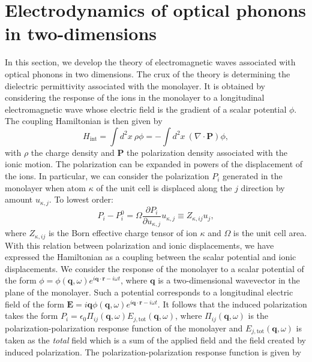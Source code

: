 \documentclass[aps,prb,twocolumn,
groupedaddress,superscriptaddress,
amsfonts,amssymb,amsmath,floatfix,
citeautoscript]{revtex4-1}
\begin{document}
	\section{Electrodynamics of optical phonons in two-dimensions}
	
	In this section, we develop the theory of electromagnetic waves associated with optical phonons in two dimensions. The crux of the theory is determining the dielectric permittivity associated with the monolayer. It is obtained by considering the response of the ions in the monolayer to a longitudinal electromagnetic wave whose electric field is the gradient of a scalar potential $\phi$. The coupling Hamiltonian is then given by
	\begin{equation}
	H_{\mathrm{int}} = \int d^2x ~\rho \phi = -\int d^2x~ (\nabla\cdot\mathbf{P})\phi,
	\end{equation} 
	with $\rho$ the charge density and $\mathbf{P}$ the polarization density associated with the ionic motion. The polarization can be expanded in powers of the displacement of the ions. In particular, we can consider the polarization $P_i$ generated in the monolayer when atom $\kappa$ of the unit cell is displaced along the $j$ direction by amount $u_{\kappa,j}$. To lowest order:
	\begin{equation}
	P_i - P_i^{0} = \Omega\frac{\partial P_i}{\partial u_{\kappa,j}}u_{\kappa,j} \equiv Z_{\kappa,ij}u_{j},
	\end{equation} 
	where $Z_{\kappa,ij}$ is the Born effective charge tensor of ion $\kappa$ and $\Omega$ is the unit cell area. With this relation between polarization and ionic displacements, we have expressed the Hamiltonian as a coupling between the scalar potential and ionic displacements. We consider the response of the monolayer to a scalar potential of the form $\phi = \phi(\mathbf{q},\omega)e^{i\mathbf{q}\cdot\mathbf{r}-i\omega t}$, where $\mathbf{q}$ is a two-dimensional wavevector in the plane of the monolayer. Such a potential corresponds to a longitudinal electric field of the form $\mathbf{E} = i\mathbf{q}\phi(\mathbf{q},\omega)e^{i\mathbf{q}\cdot\mathbf{r}-i\omega t}$. It follows that the induced polarization takes the form $P_i  = \epsilon_0\Pi_{ij}(\mathbf{q},\omega)E_{j,\mathrm{tot}}(\mathbf{q},\omega)$, where $\Pi_{ij}(\mathbf{q},\omega)$ is the polarization-polarization response function of the monolayer and  $E_{j,\mathrm{tot}}(\mathbf{q},\omega)$ is taken as the \textit{total} field which is a sum of the applied field and the field created by induced polarization. The polarization-polarization response function is given by
\end{document}
